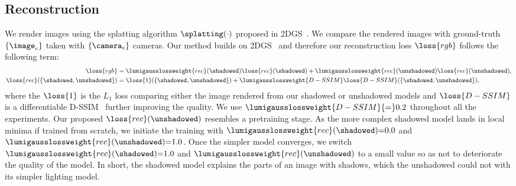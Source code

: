   \subsection{Reconstruction}
    \label{subsec:lumigauss-reconstruction}
    We render images using the splatting algorithm $\splatting(\cdot)$
    proposed in 2DGS~\cite{huang20242d}.
    We compare the rendered images with ground-truth $\{\image_c\}$ taken with
    $\{\camera_c\}$ cameras.
    Our method builds on 2DGS~\cite{huang20242d} and therefore our reconstruction loss $\loss{rgb}$ follows the following term:
    \begin{align}
      \loss{rgb}                             & = \lumigausslossweight{rec}(\shadowed)\loss{rec}(\shadowed) + \lumigausslossweight{rec}(\unshadowed)\loss{rec}(\unshadowed), \\
      \loss{rec}(\{\shadowed, \unshadowed\}) & = \loss{1}(\{\shadowed, \unshadowed\}) + \lumigausslossweight{D-SSIM}\loss{D-SSIM}(\{\shadowed, \unshadowed\}),
    \end{align}
    where the $\loss{1}$ is the $L_1$ loss comparing either the image rendered from our shadowed or unshadowed models and $\loss{D-SSIM}$ is a differentiable D-SSIM~\cite{wang2004image} further improving the quality.
    We use $\lumigausslossweight{D-SSIM}{=}0.2$ throughout all the
    experiments.
    Our proposed $\loss{rec}(\unshadowed)$ resembles a pretraining stage.
    As the more complex shadowed model lands in local minima if trained from
    scratch, we initiate the training with
    $\lumigausslossweight{rec}(\shadowed){=}0.0$ and
    $\lumigausslossweight{rec}(\unshadowed){=}1.0$.
    Once the simpler model converges, we switch
    $\lumigausslossweight{rec}(\shadowed){=}1.0$ and
    $\lumigausslossweight{rec}(\unshadowed)$ to a small value so as not to
    deteriorate the quality of the model.
    In short, the shadowed model explains the parts of an image with shadows,
    which the unshadowed could not with its simpler lighting model.





